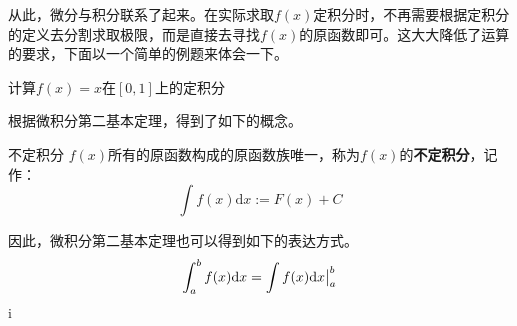 从此，微分与积分联系了起来。在实际求取$f(x)$定积分时，不再需要根据定积分的定义去分割求取极限，而是直接去寻找$f(x)$的原函数即可。这大大降低了运算的要求，下面以一个简单的例题来体会一下。
\begin{example}{}
计算$f(x)=x$在$[0,1]$上的定积分
\end{example}

根据微积分第二基本定理，得到了如下的概念。
\begin{definition}{不定积分}
$f(x)$所有的原函数构成的原函数族唯一，称为$f(x)$的\textbf{不定积分}，记作：
$$\int f(x)\mathrm {d}x:=F(x)+C$$
\end{definition}

因此，微积分第二基本定理也可以得到如下的表达方式。
$$\int_{a}^{b} f(x)\mathrm {d}x=\int f(x)\mathrm {d}x\big{|}_{a}^{b}$$
i

